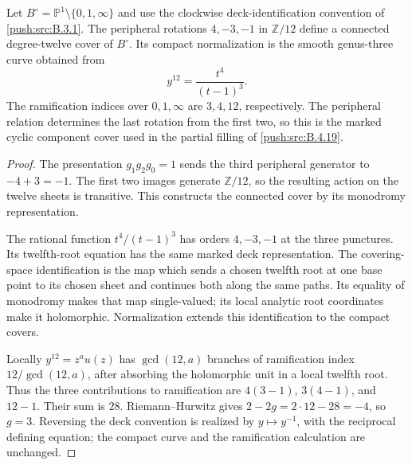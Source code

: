 \begin{proposition}\label{push:src:B.3.2}\label{push:B32}
Let $B^\circ=\mathbb P^1\setminus\{0,1,\infty\}$ and use the
clockwise deck-identification convention of \ref{push:src:B.3.1}.
The peripheral rotations $4,-3,-1$ in $\mathbb Z/12$ define a
connected degree-twelve cover of $B^\circ$. Its compact
normalization is the smooth genus-three curve obtained from
\[
 y^{12}=\frac{t^4}{(t-1)^3}.
\]
The ramification indices over $0,1,\infty$ are $3,4,12$,
respectively. The peripheral relation determines the last rotation
from the first two, so this is the marked cyclic component cover
used in the partial filling of \ref{push:src:B.4.19}.
\end{proposition}
\begin{proof}
The presentation $g_1g_2g_0=1$ sends the third peripheral generator
to $-4+3=-1$. The first two images generate $\mathbb Z/12$, so
the resulting action on the twelve sheets is transitive. This
constructs the connected cover by its monodromy representation.

The rational function $t^4/(t-1)^3$ has orders $4,-3,-1$ at the
three punctures. Its twelfth-root equation has the same marked
deck representation. The covering-space identification is the map
which sends a chosen twelfth root at one base point to its chosen
sheet and continues both along the same paths. Its equality of
monodromy makes that map single-valued; its local analytic root
coordinates make it holomorphic. Normalization extends this
identification to the compact covers.

Locally $y^{12}=z^a u(z)$ has $\gcd(12,a)$ branches of ramification
index $12/\gcd(12,a)$, after absorbing the holomorphic unit in a
local twelfth root. Thus the three contributions to ramification
are $4(3-1)$, $3(4-1)$, and $12-1$. Their sum is $28$.
Riemann--Hurwitz gives $2-2g=2\cdot12-28=-4$, so $g=3$.
Reversing the deck convention is realized by $y\mapsto y^{-1}$,
with the reciprocal defining equation; the compact curve and the
ramification calculation are unchanged.
\end{proof}
